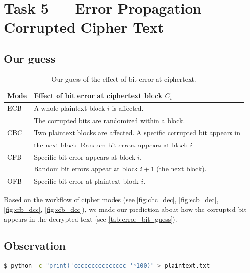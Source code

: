 \section{Task 5 --- Error Propagation --- Corrupted Cipher Text}
\subsection{Our guess}
%
\begin{table}
    \centering
    \begin{tabular}{|l|l|}
        \hline
        Mode & Effect of bit error at ciphertext block \(C_i\)\\
        \hline
        ECB & A whole plaintext block \(i\) is affected.\\
         & The corrupted bits are randomized within a block.\\
        \hline
        CBC & Two plaintext blocks are affected. A specific corrupted bit appears in\\
         & the next block. Random bit errors appears at block \(i\).\\
        \hline
        CFB & Specific bit error appears at block \(i\).\\
          & Random bit errors appear at block \(i+1\) (the next block).\\
        \hline
        OFB & Specific bit error at plaintext block \(i\).\\
        \hline
    \end{tabular}
    \caption{Our guess of the effect of bit error at ciphertext.}
    \label{tab:error_bit_guess}
\end{table}

Based on the workflow of cipher modes (see \autoref{fig:cbc_dec}, \autoref{fig:ecb_dec},
\autoref{fig:cfb_dec}, \autoref{fig:ofb_dec}), we made our prediction about how the corrupted
bit appears in the decrypted text (see \autoref{tab:error_bit_guess}).
\subsection{Observation}
%
\begin{lstlisting}[language=Bash, caption=A script generating {\fontfamily{qcr}
    \selectfont plaintext.txt}., label={lst:plaintext_generation} ]
    $ python -c "print('ccccccccccccccc '*100)" > plaintext.txt
\end{lstlisting}

